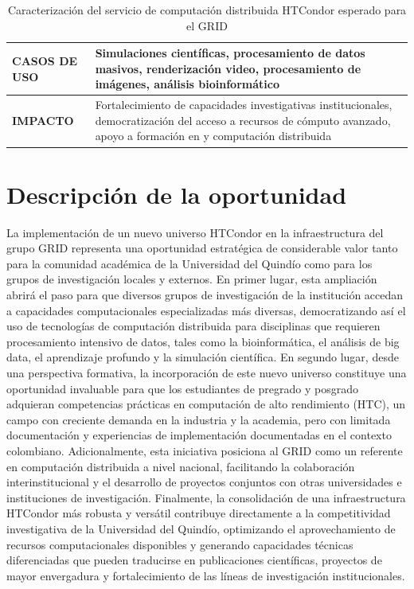 \begin{table}[H]
\begin{tabularx}{\textwidth}{|>{\raggedright\arraybackslash}p{}|X|}
		\hline
		\textbf{CASOS DE USO}           & Simulaciones científicas, procesamiento de datos masivos, renderización video, procesamiento de imágenes, análisis bioinformático                                                                                              \\
		\hline
		\textbf{IMPACTO}                & Fortalecimiento de capacidades investigativas institucionales, democratización del acceso a recursos de cómputo avanzado, apoyo a formación en \HTC y computación distribuida                                                  \\
		\hline
	\end{tabularx}
	\caption{Caracterización del servicio de computación distribuida HTCondor esperado para el GRID}\label{tab:servicio-htcondor}
\end{table}
\section{Descripción de la oportunidad}
\noindent
La implementación de un nuevo universo HTCondor en la infraestructura del grupo GRID representa una oportunidad estratégica de considerable valor tanto para la comunidad académica de la Universidad del Quindío como para los grupos de investigación locales y externos. En primer lugar, esta ampliación abrirá el paso para que diversos grupos de investigación de la institución accedan a capacidades computacionales especializadas más diversas, democratizando así el uso de tecnologías de computación distribuida para disciplinas que requieren procesamiento intensivo de datos, tales como la bioinformática, el análisis de big data, el aprendizaje profundo y la simulación científica. En segundo lugar, desde una perspectiva formativa, la incorporación de este nuevo universo constituye una oportunidad invaluable para que los estudiantes de pregrado y posgrado adquieran competencias prácticas en computación de alto rendimiento (HTC), un campo con creciente demanda en la industria y la academia, pero con limitada documentación y experiencias de implementación documentadas en el contexto colombiano. Adicionalmente, esta iniciativa posiciona al GRID como un referente en computación distribuida a nivel nacional, facilitando la colaboración interinstitucional y el desarrollo de proyectos conjuntos con otras universidades e instituciones de investigación. Finalmente, la consolidación de una infraestructura HTCondor más robusta y versátil contribuye directamente a la competitividad investigativa de la Universidad del Quindío, optimizando el aprovechamiento de recursos computacionales disponibles y generando capacidades técnicas diferenciadas que pueden traducirse en publicaciones científicas, proyectos de mayor envergadura y fortalecimiento de las líneas de investigación institucionales.


